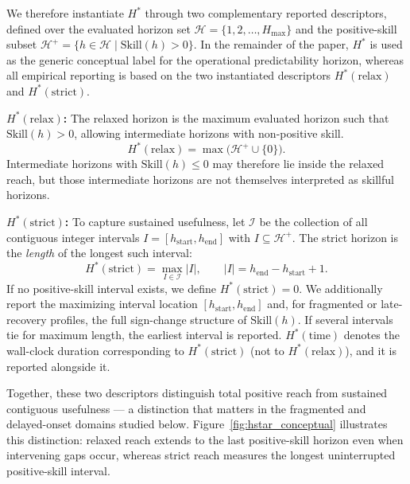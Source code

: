 \documentclass[pdflatex]{sn-jnl}
\begin{document}
We therefore instantiate $H^*$ through two complementary reported
descriptors, defined over the evaluated horizon set
$\mathcal{H} = \{1, 2, \dots, H_{\max}\}$ and the positive-skill
subset $\mathcal{H}^+ = \{h \in \mathcal{H} \mid \mathrm{Skill}(h) > 0\}$. In the remainder of the paper, $H^*$ is used as the generic conceptual label for the operational predictability horizon, whereas all empirical reporting is based on the two instantiated descriptors $H^*(\mathrm{relax})$ and $H^*(\mathrm{strict})$.



\textbf{$H^*(\mathrm{relax})$:} The relaxed horizon is the maximum
evaluated horizon such that $\mathrm{Skill}(h)>0$, allowing intermediate
horizons with non-positive skill.
\begin{equation}
  H^*(\mathrm{relax}) = \max\!\bigl(\mathcal{H}^+ \cup \{0\}\bigr).
\end{equation}
Intermediate horizons with $\mathrm{Skill}(h)\leq 0$ may therefore lie
inside the relaxed reach, but those intermediate horizons are not
themselves interpreted as skillful horizons.

\textbf{$H^*(\mathrm{strict})$:} To capture sustained usefulness, let
$\mathcal{I}$ be the collection of all contiguous integer intervals
$I=[h_{\mathrm{start}},h_{\mathrm{end}}]$ with $I\subseteq\mathcal{H}^+$.
The strict horizon is the \emph{length} of the longest such interval:
\begin{equation}
  H^*(\mathrm{strict}) = \max_{I\in\mathcal{I}} |I|,
  \qquad |I| = h_{\mathrm{end}} - h_{\mathrm{start}} + 1.
\end{equation}
If no positive-skill interval exists, we define
$H^*(\mathrm{strict})=0$. We additionally report the maximizing interval location
$[h_{\mathrm{start}}, h_{\mathrm{end}}]$ and, for fragmented or
late-recovery profiles, the full sign-change structure of
$\mathrm{Skill}(h)$. If several intervals tie for maximum length, the
earliest interval is reported. $H^*(\mathrm{time})$ denotes the wall-clock
duration corresponding to $H^*(\mathrm{strict})$ (not to
$H^*(\mathrm{relax})$), and it is reported alongside it.

Together, these two descriptors distinguish total positive reach from
sustained contiguous usefulness — a distinction that matters in the
fragmented and delayed-onset domains studied below.
Figure~\ref{fig:hstar_conceptual} illustrates this distinction: relaxed
reach extends to the last positive-skill horizon even when intervening
gaps occur, whereas strict reach measures the longest uninterrupted
positive-skill interval.
\end{document}
